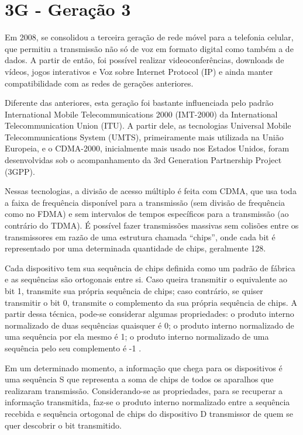 \documentclass[11pt,oneside,a4paper]{abntex2}
\begin{document}
\section*{3G - Geração 3}
\label{3g}

Em 2008, se consolidou a terceira geração de rede móvel para a telefonia celular, que permitiu a transmissão não só de voz em formato digital como também a de dados. A partir de então, foi possível realizar videoconferências, downloads de vídeos, jogos interativos e Voz sobre Internet Protocol (IP) \cite{tcc1} e ainda manter compatibilidade com as redes de gerações anteriores.

Diferente das anteriores, esta geração foi bastante influenciada pelo padrão International Mobile Telecommunications 2000 (IMT-2000) da International Telecommunication Union (ITU). A partir dele, as tecnologias Universal Mobile Telecommunications System (UMTS), primeiramente mais utilizada na União Europeia, e o CDMA-2000, inicialmente mais usado nos Estados Unidos, foram desenvolvidas sob o acompanhamento da 3rd Generation Partnership Project (3GPP).

Nessas tecnologias, a divisão de acesso múltiplo é feita com CDMA, que usa toda a faixa de frequência disponível para a transmissão (sem divisão de frequência como no FDMA) e sem intervalos de tempos específicos para a transmissão (ao contrário do TDMA). É possível fazer transmissões massivas sem colisões entre os transmissores em razão de  uma estrutura chamada ``chips'', onde cada bit é representado por uma determinada quantidade de chips, geralmente 128.

Cada dispositivo tem sua sequência de chips definida como um padrão de fábrica e as sequências são ortogonais entre si. Caso queira transmitir o equivalente ao bit 1, transmite sua própria sequência de chips; caso contrário, se quiser transmitir o bit 0, transmite o complemento da sua própria sequência de chips. A partir dessa técnica, pode-se considerar algumas propriedades: o produto interno normalizado de duas sequências quaisquer é 0; o produto interno normalizado de uma sequência por ela mesmo é 1; o produto interno normalizado de uma sequência pelo seu complemento é -1 \cite{aula4}.

Em um determinado momento, a informação que chega para os dispositivos é uma sequência S que representa a soma de chips de todos os aparalhos que realizaram transmissão. Considerando-se as propriedades, para se recuperar a informação transmitida, faz-se o produto interno normalizado entre a sequência recebida e sequência ortogonal de chips do dispositivo D transmissor de quem se quer descobrir o bit transmitido.
\end{document}
